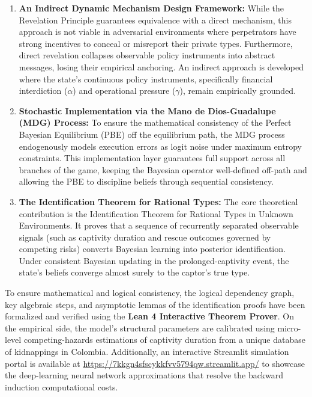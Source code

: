\documentclass[12pt]{article}
\begin{document}
\begin{enumerate}
    \item \textbf{An Indirect Dynamic Mechanism Design Framework:} While the Revelation Principle guarantees equivalence with a direct mechanism, this approach is not viable in adversarial environments where perpetrators have strong incentives to conceal or misreport their private types. Furthermore, direct revelation collapses observable policy instruments into abstract messages, losing their empirical anchoring. An indirect approach is developed where the state's continuous policy instruments, specifically financial interdiction ($\alpha$) and operational pressure ($\gamma$), remain empirically grounded.
    
    \item \textbf{Stochastic Implementation via the Mano de Dios-Guadalupe (MDG) Process:} To ensure the mathematical consistency of the Perfect Bayesian Equilibrium (PBE) off the equilibrium path, the MDG process endogenously models execution errors as logit noise under maximum entropy constraints. This implementation layer guarantees full support across all branches of the game, keeping the Bayesian operator well-defined off-path and allowing the PBE to discipline beliefs through sequential consistency.
    
    \item \textbf{The Identification Theorem for Rational Types:} The core theoretical contribution is the Identification Theorem for Rational Types in Unknown Environments. It proves that a sequence of recurrently separated observable signals (such as captivity duration and rescue outcomes governed by competing risks) converts Bayesian learning into posterior identification. Under consistent Bayesian updating in the prolonged-captivity event, the state's beliefs converge almost surely to the captor's true type.
\end{enumerate}

To ensure mathematical and logical consistency, the logical dependency graph, key algebraic steps, and asymptotic lemmas of the identification proofs have been formalized and verified using the \textbf{Lean 4 Interactive Theorem Prover}. On the empirical side, the model's structural parameters are calibrated using micro-level competing-hazards estimations of captivity duration from a unique database of kidnappings in Colombia. Additionally, an interactive Streamlit simulation portal is available at \url{https://7kkgn4sfscykkfvv5794qw.streamlit.app/} to showcase the deep-learning neural network approximations that resolve the backward induction computational costs. 
\end{document}
